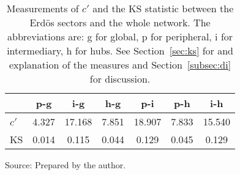 \begin{table}[h!]
\begin{center}
\caption{Measurements of $c'$ and the KS statistic between the Erd\"os sectors and the whole network. The abbreviations are: g for global, p for peripheral, i for intermediary, h for hubs. See Section~\ref{sec:ks} for and explanation of the measures and Section~\ref{subsec:di} for discussion.}
\label{tab:kolTok}
\begin{tabular}{| l || c | c | c | c | c | c |}\hline
{\bf } & {\bf p-g} & {\bf i-g} & {\bf h-g} & {\bf p-i} & {\bf p-h} & {\bf i-h} \\\hline\hline
$c'$ & 4.327  & 17.168  & 7.851  & 18.907  & 7.833  & 15.540 \\
KS & 0.014  & 0.115  & 0.044  & 0.129  & 0.045  & 0.129 \\\hline
\end{tabular}
\begin{flushleft}
Source: Prepared by the author.\
\end{flushleft}
\end{center}
\end{table}
